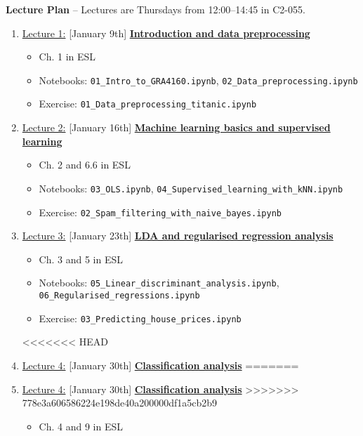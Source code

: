 \documentclass[12pt, a4paper]{article}
\begin{document}
\newpage
\noindent\textbf{\large Lecture Plan}
-- Lectures are Thursdays from 12:00--14:45 in C2-055. \\
\begin{enumerate}
  \item[] \underline{Lecture 1:} [January 9th] \underline{\bf Introduction and data preprocessing}
    {\small
      \begin{itemize}
        \item Ch. 1 in ESL
        \item Notebooks: \texttt{01\_Intro\_to\_GRA4160.ipynb}, \texttt{02\_Data\_preprocessing.ipynb}
        \item Exercise: \texttt{01\_Data\_preprocessing\_titanic.ipynb}
      \end{itemize}
    }
  \item[] \underline{Lecture 2:} [January 16th] \underline{\bf Machine learning basics and supervised learning}
    {\small
      \begin{itemize}
        \item Ch. 2 and 6.6 in ESL
        \item Notebooks: \texttt{03\_OLS.ipynb}, \texttt{04\_Supervised\_learning\_with\_kNN.ipynb}
        \item Exercise: \texttt{02\_Spam\_filtering\_with\_naive\_bayes.ipynb}
      \end{itemize}
    }
  \item[] \underline{Lecture 3:} [January 23th] \underline{\bf LDA and regularised regression analysis}
    {\small
      \begin{itemize}
        \item Ch. 3 and 5 in ESL
        \item Notebooks: \texttt{05\_Linear\_discriminant\_analysis.ipynb}, \texttt{06\_Regularised\_regressions.ipynb}
        \item Exercise: \texttt{03\_Predicting\_house\_prices.ipynb}
      \end{itemize}
    }
<<<<<<< HEAD
\item [] \underline{Lecture 4:} [January 30th] \underline{\bf Classification analysis}
=======
  \item [] \underline{Lecture 4:} [January 30th] \underline{\bf Classification analysis}
>>>>>>> 778e3a606586224e198de40a200000df1a5cb2b9
        {\small
          \begin{itemize}
            \item Ch. 4 and 9 in ESL

\end{itemize}}
\end{enumerate}
\end{document}
